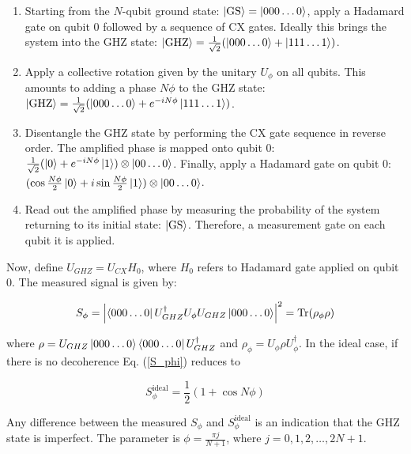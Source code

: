 \begin{enumerate}

\item Starting from the $N$-qubit ground state: $\left| \text{GS} \right \rangle = \left| 000 \dots 0 \right \rangle$, apply a Hadamard gate on qubit 0 followed by a sequence of CX gates. Ideally this brings the system into the GHZ state: $\left| \text{GHZ} \right \rangle= \frac{1}{\sqrt{2}}(\left| 000 \dots 0 \right \rangle + \left| 111 \dots 1 \right \rangle)$.

\item Apply a collective rotation given by the unitary $U_{\phi}$ on all qubits. This amounts to adding a phase $N \phi$ to the GHZ state: $\left| \text{GHZ} \right \rangle= \frac{1}{\sqrt{2}}(\left| 000 \dots 0 \right \rangle + e^{-i N \phi} \left| 111 \dots 1 \right \rangle)$.

\item Disentangle the GHZ state by performing the CX gate sequence in reverse order. The amplified phase is mapped onto qubit 0: $\frac{1}{\sqrt{2}}(\left| 0 \right \rangle+e^{-i N \phi} \left| 1 \right \rangle) \otimes  \left| 00 \dots 0 \right \rangle$. Finally, apply a Hadamard gate on qubit 0: $(\cos{\frac{N \phi}{2}}\left| 0 \right \rangle+i \sin{\frac{N \phi}{2}} \left| 1 \right \rangle) \otimes  \left| 00 \dots 0 \right \rangle$.

\item Read out the amplified phase by measuring the probability of the system returning to its initial state: $\left| \text{GS} \right \rangle$. Therefore, a measurement gate on each qubit it is applied.
\end{enumerate}


\vspace{0.3cm}
\noindent Now, define $U_{GHZ}=U_{CX}H_0$, where $H_0$ refers to Hadamard gate applied on qubit 0. The measured signal is given by:

\begin{equation}
 S_{\phi} = \left| \left\langle 000 \dots 0 \right | U_{GHZ}^{\dagger} U_{\phi} U_{GHZ} \left| 000 \dots 0 \right \rangle  \right|^2  = \operatorname{Tr} (\rho_\phi \rho) 
 \label{S_phi} 
\end{equation}

\noindent where $\rho = U_{GHZ} \left| 000 \dots 0 \right \rangle \left\langle 000 \dots 0 \right | U_{GHZ}^{\dagger}$ and $\rho_\phi = U_\phi \rho U_\phi^\dagger$. 
 In the ideal case, if there is no decoherence Eq. (\ref{S_phi}) reduces to

\begin{equation}
 S_{\phi}^{\text{ideal}} = \frac{1}{2} (1 + \cos{N \phi}) 
 \label{S_phi_ideal}
 \end{equation}

\noindent Any difference between the measured $S_{\phi}$ and $S_{\phi}^{\text{ideal}}$ is an indication that the GHZ state is imperfect. The parameter is $\phi = \frac{ \pi j }{N+1}$, where $j=0,1,2,\dots,2N+1$. 

